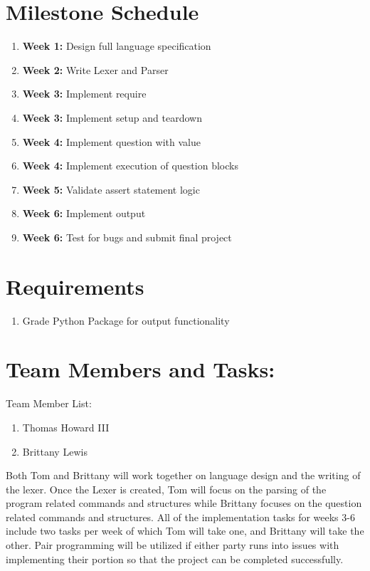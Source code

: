 \documentclass{article}
\begin{document}
    \section{Milestone Schedule}
    \begin{enumerate}
        \item {\bf Week 1:} Design full language specification
        \item {\bf Week 2:} Write Lexer and Parser
        \item {\bf Week 3:} Implement require
        \item{\bf Week 3:}  Implement setup and teardown
        \item {\bf Week 4:} Implement question with value
        \item {\bf Week 4:} Implement execution of question blocks
        \item {\bf Week 5:} Validate assert statement logic
        \item {\bf Week 6:} Implement output
        \item {\bf Week 6:} Test for bugs and submit final project
    \end{enumerate}

    \section{Requirements}
    \begin{enumerate}
        \item Grade Python Package for output functionality
    \end{enumerate}
    
    \section {Team Members and Tasks:}
    Team Member List:
    
    \begin{enumerate}
        \item Thomas Howard III
        \item Brittany Lewis
    \end{enumerate}
    
    Both Tom and Brittany will work together on language design and the writing of the lexer. Once the Lexer is created, Tom will focus on the parsing of the program related commands and structures while Brittany focuses on the question related commands and structures. All of the implementation tasks for weeks 3-6 include two tasks per week of which Tom will take one, and Brittany will take the other. Pair programming will be utilized if either party runs into issues with implementing their portion so that the project can be completed successfully.
\end{document}
